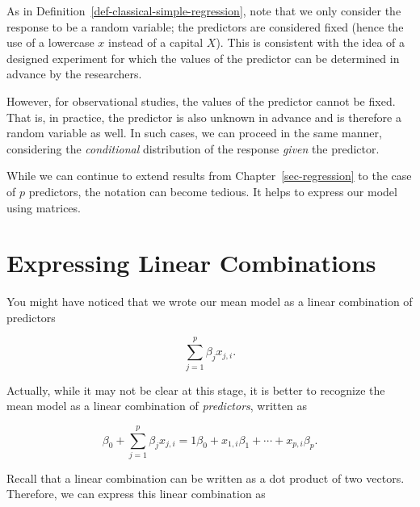 \documentclass[
  letterpaper,
  DIV=11,
  numbers=noendperiod]{scrreprt}
\theoremstyle{definition}
\theoremstyle{plain}
\theoremstyle{definition}
\theoremstyle{remark}
\begin{document}
\begin{tcolorbox}[enhanced jigsaw, rightrule=.15mm, leftrule=.75mm, opacityback=0, coltitle=black, bottomrule=.15mm, opacitybacktitle=0.6, left=2mm, colframe=quarto-callout-note-color-frame, breakable, colback=white, arc=.35mm, toprule=.15mm, toptitle=1mm, bottomtitle=1mm, title=\textcolor{quarto-callout-note-color}{\faInfo}\hspace{0.5em}{Note}, titlerule=0mm, colbacktitle=quarto-callout-note-color!10!white]

As in Definition~\ref{def-classical-simple-regression}, note that we
only consider the response to be a random variable; the predictors are
considered fixed (hence the use of a lowercase \(x\) instead of a
capital \(X\)). This is consistent with the idea of a designed
experiment for which the values of the predictor can be determined in
advance by the researchers.

However, for observational studies, the values of the predictor cannot
be fixed. That is, in practice, the predictor is also unknown in advance
and is therefore a random variable as well. In such cases, we can
proceed in the same manner, considering the \emph{conditional}
distribution of the response \emph{given} the predictor.

\end{tcolorbox}

While we can continue to extend results from
Chapter~\ref{sec-regression} to the case of \(p\) predictors, the
notation can become tedious. It helps to express our model using
matrices.

\section{Expressing Linear
Combinations}\label{expressing-linear-combinations}

You might have noticed that we wrote our mean model as a linear
combination of predictors

\[\sum_{j=1}^{p} \beta_j x_{j,i}.\]

Actually, while it may not be clear at this stage, it is better to
recognize the mean model as a linear combination of \emph{predictors},
written as

\[\beta_0 + \sum_{j=1}^{p} \beta_j x_{j,i} = 1 \beta_0 + x_{1,i} \beta_1 + \dotsb + x_{p,i} \beta_p.\]

Recall that a linear combination can be written as a dot product of two
vectors. Therefore, we can express this linear combination as
\end{document}
